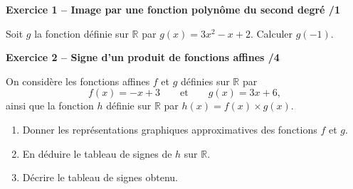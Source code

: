 \documentclass[10pt,a4paper]{article}
\begin{document}

\textbf{Exercice 1 -- Image par une fonction polynôme du second degré \hfill /1}

Soit \(g\) la fonction définie sur \(\mathbb{R}\) par \(g(x)=3x^2-x+2\). Calculer \(g(-1)\).

\vspace{2cm}

\textbf{Exercice 2 -- Signe d'un produit de fonctions affines \hfill /4}

On considère les fonctions affines \(f\) et \(g\) définies sur \(\mathbb{R}\) par
\[
f(x)=-x+3 \qquad\text{et}\qquad g(x)=3x+6,
\]
ainsi que la fonction \(h\) définie sur \(\mathbb{R}\) par \(h(x)=f(x)\times g(x)\).

\begin{enumerate}
\item Donner les représentations graphiques approximatives des fonctions \(f\) et \(g\).

\vspace{2cm}

\item En déduire le tableau de signes de \(h\) sur \(\mathbb{R}\).

\vspace{4cm}

\item Décrire le tableau de signes obtenu.
\end{enumerate}
\end{document}
